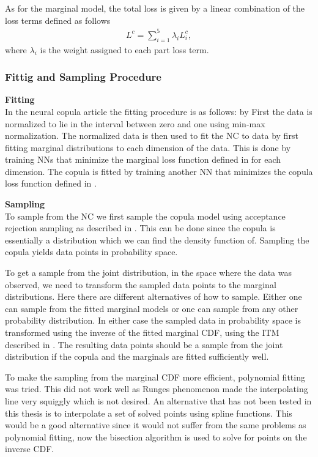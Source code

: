 As for the marginal model, the total loss is given by a linear combination of the loss terms defined as follows
\begin{align*}
    L^c = \sum_{i=1}^5 \lambda_i L_i^c,
\end{align*}
where $\lambda_i$ is the weight assigned to each part loss term. 


\subsubsection{Fittig and Sampling Procedure}\label{sec:NeuralCopulaFittingAndSampling}
\textbf{Fitting}\\
In the neural copula article the fitting procedure is as follows: by 
First the data is normalized to lie in the interval between zero and one using min-max normalization. The normalized data is then used to fit the \gls{NC} to data by first fitting marginal distributions to each dimension of the data. This is done by training \gls{NN}s that minimize the marginal loss function defined in  for each dimension. The copula is fitted by training another \gls{NN} that minimizes the copula loss function defined in . 

\textbf{Sampling}\\
To sample from the \gls{NC} we first sample the copula model using acceptance rejection sampling as described in . This can be done since the copula is essentially a distribution which we can find the density function of. Sampling the copula yields data points in probability space. 

To get a sample from the joint distribution, in the space where the data was observed, we need to transform the sampled data points to the marginal distributions. Here there are different alternatives of how to sample. Either one can sample from the fitted marginal models or one can sample from any other probability distribution. In either case the sampled data in probability space is transformed using the inverse of the fitted marginal \gls{CDF}, using the \gls{ITM} described in . The resulting data points should be a sample from the joint distribution if the copula and the marginals are fitted sufficiently well. 

\begin{remark}
     To make the sampling from the marginal \gls{CDF} more efficient, polynomial fitting was tried. This did not work well as Runges phenomenon made the interpolating line very squiggly which is not desired. An alternative that has not been tested in this thesis is to interpolate a set of solved points using spline functions. This would be a good alternative since it would not suffer from the same problems as polynomial fitting, now the bisection algorithm is used to solve for points on the inverse \gls{CDF}.   
\end{remark}



